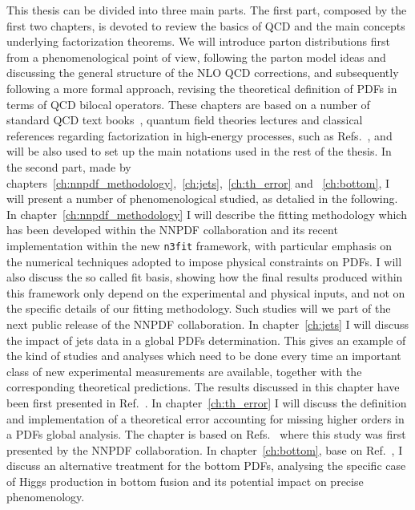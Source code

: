 This thesis can be divided into three main parts. The first part, composed by the first two chapters, 
is devoted to review the basics of QCD and the main concepts underlying factorization theorems. 
We will introduce parton distributions first from a phenomenological point of view, following the parton model ideas and
discussing the general structure of the NLO QCD corrections, and subsequently following a more formal approach,
revising the theoretical definition of PDFs in terms of QCD bilocal operators.
These chapters are based on a number of standard QCD text books~\cite{Ellis:1991qj,Muta:2010xua,Collins:1984xc},
quantum field theories lectures and classical references regarding factorization in high-energy processes,
such as Refs.~\cite{Collins:1980ui, Collins:1981uw, Collins:1989gx}, and will be also used to set up the 
main notations used in the rest of the thesis.
%
In the second part, made by chapters~\ref{ch:nnpdf_methodology},~\ref{ch:jets},~\ref{ch:th_error} and ~\ref{ch:bottom}, 
I will present a number of phenomenological studied, as detalied in the following.
%
In chapter~\ref{ch:nnpdf_methodology} I will describe the fitting methodology which has been developed
within the NNPDF collaboration and its recent implementation within the new {\tt n3fit} framework, 
with particular emphasis on the numerical techniques adopted to impose physical constraints on PDFs.
I will also discuss the so called fit basis, showing how
the final results produced within this framework only depend on the experimental and physical inputs, 
and not on the specific details of our fitting methodology. Such studies will we part of the next public release
of the NNPDF collaboration.
%
In chapter~\ref{ch:jets} I will discuss the impact of jets data in a global PDFs determination. 
This gives an example of the kind of studies and analyses which need to be done
every time an important class of new experimental measurements are available, together with the corresponding
theoretical predictions. 
The results discussed in this chapter have been first presented in Ref.~\cite{AbdulKhalek:2020jut}.
In chapter~\ref{ch:th_error} I will discuss the definition and implementation of a theoretical error 
accounting for missing higher orders in a PDFs global analysis. 
The chapter is based on Refs.~\cite{AbdulKhalek:2019bux,AbdulKhalek:2019ihb} where this
study was first presented by the NNPDF collaboration.
In chapter~\ref{ch:bottom}, base on Ref.~\cite{Forte:2019hjc}, I discuss an alternative treatment for the bottom PDFs,
analysing the specific case of Higgs production in bottom fusion and its potential impact on precise phenomenology. 
